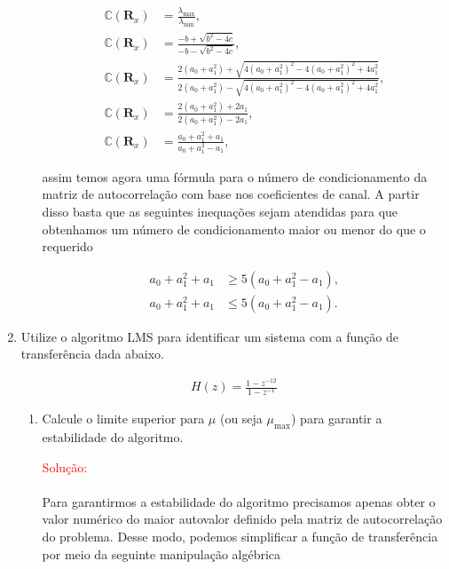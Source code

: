 \documentclass[a4paper,10pt]{article}
\begin{document}
\begin{enumerate}
\begin{enumerate}
						\begin{align}
							\mathbb{C} (\mathbf{R}_{x}) &= \frac{\lambda_{\text{max}}}{\lambda_{\text{min}}}, \\
							\mathbb{C} (\mathbf{R}_{x}) &= \frac{- b + \sqrt{b^{2} - 4c}}{- b - \sqrt{b^{2} - 4c}}, \\
							\mathbb{C} (\mathbf{R}_{x}) &= \frac{2 (a_{0} + a^{2}_{1}) + \sqrt{4 (a_{0} + a^{2}_{1})^{2} - 4 (a_{0} + a^{2}_{1})^{2} + 4 a^{2}_{1}}}{2 (a_{0} + a^{2}_{1}) - \sqrt{4 (a_{0} + a^{2}_{1})^{2} - 4 (a_{0} + a^{2}_{1})^{2} + 4 a^{2}_{1}}}, \\
							\mathbb{C} (\mathbf{R}_{x}) &= \frac{2 (a_{0} + a^{2}_{1}) + 2a_{1}}{2 (a_{0} + a^{2}_{1}) - 2a_{1}}, \\
							\mathbb{C} (\mathbf{R}_{x}) &= \frac{a_{0} + a^{2}_{1} + a_{1}}{a_{0} + a^{2}_{1} - a_{1}},
						\end{align}

						assim temos agora uma fórmula para o número de condicionamento da matriz de autocorrelação com base nos coeﬁcientes de canal. A partir disso basta que as seguintes inequações sejam atendidas para que
						obtenhamos um número de condicionamento maior ou menor do que o requerido

						\begin{align}
							a_{0} + a^{2}_{1} + a_{1} &\geq 5 (a_{0} + a^{2}_{1} - a_{1}), \\
							a_{0} + a^{2}_{1} + a_{1} &\leq 5 (a_{0} + a^{2}_{1} - a_{1}).
						\end{align}

				\end{enumerate}
			
			\item Utilize o algoritmo LMS para identiﬁcar um sistema com a função de transferência dada abaixo.
			
				\begin{align}
					H(z) = \frac{1 - z^{-12}}{1 - z^{-1}}
				\end{align}
			
				\begin{enumerate}
					
					\item Calcule o limite superior para $\mu$ (ou seja $\mu_{\text{max}}$) para garantir a estabilidade do algoritmo.
					
						\textcolor{red}{Solução:}
					
						\paragraph{}Para garantirmos a estabilidade do algoritmo precisamos apenas obter o valor numérico do maior autovalor definido pela matriz de autocorrelação do problema.
						Desse modo, podemos simplificar a função de transferência por meio da seguinte manipulação algébrica


\end{enumerate}
\end{enumerate}
\end{document}
